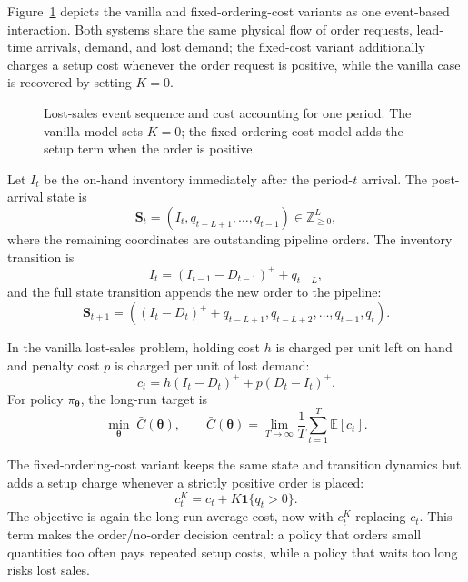 \documentclass[authoryear,11pt]{elsarticle}
\newcommand{\btheta}{\boldsymbol{\theta}}
\begin{document}
Figure~\ref{fig:env-lostsales} depicts the vanilla and fixed-ordering-cost variants as one event-based interaction. Both systems share the same physical flow of order requests, lead-time arrivals, demand, and lost demand; the fixed-cost variant additionally charges a setup cost whenever the order request is positive, while the vanilla case is recovered by setting $K=0$.

\begin{figure}[H]
\centering
\LostSalesEventFigure
\caption{Lost-sales event sequence and cost accounting for one period. The vanilla model sets $K=0$; the fixed-ordering-cost model adds the setup term when the order is positive.}
\label{fig:env-lostsales}
\end{figure}

Let $I_t$ be the on-hand inventory immediately after the period-$t$ arrival. The post-arrival state is
\begin{equation}
    \mathbf S_t=(I_t,q_{t-L+1},\dots,q_{t-1})\in\mathbb{Z}_{\ge0}^{L},
    \label{eq:ls-state}
\end{equation}
where the remaining coordinates are outstanding pipeline orders. The inventory transition is
\begin{equation}
    I_t=(I_{t-1}-D_{t-1})^+ + q_{t-L},
    \label{eq:ls-transition}
\end{equation}
and the full state transition appends the new order to the pipeline:
\begin{equation}
    \mathbf S_{t+1}=\left((I_t-D_t)^+ + q_{t-L+1},q_{t-L+2},\dots,q_{t-1},q_t\right).
    \label{eq:ls-state-transition}
\end{equation}

In the vanilla lost-sales problem, holding cost $h$ is charged per unit left on hand and penalty cost $p$ is charged per unit of lost demand:
\begin{equation}
    c_t = h(I_t-D_t)^+ + p(D_t-I_t)^+.
    \label{eq:ls-cost}
\end{equation}
For policy $\pi_{\btheta}$, the long-run target is
\begin{equation}
    \min_{\btheta}\; \bar C(\btheta),\qquad
    \bar C(\btheta)=\lim_{T\to\infty}\frac{1}{T}\sum_{t=1}^{T}\mathbb{E}[c_t].
    \label{eq:ls-objective}
\end{equation}

The fixed-ordering-cost variant keeps the same state and transition dynamics but adds a setup charge whenever a strictly positive order is placed:
\begin{equation}
    c_t^K = c_t + K\mathbf{1}\{q_t>0\}.
    \label{eq:ls-fixed-cost}
\end{equation}
The objective is again the long-run average cost, now with $c_t^K$ replacing $c_t$. This term makes the order/no-order decision central: a policy that orders small quantities too often pays repeated setup costs, while a policy that waits too long risks lost sales.
\end{document}
